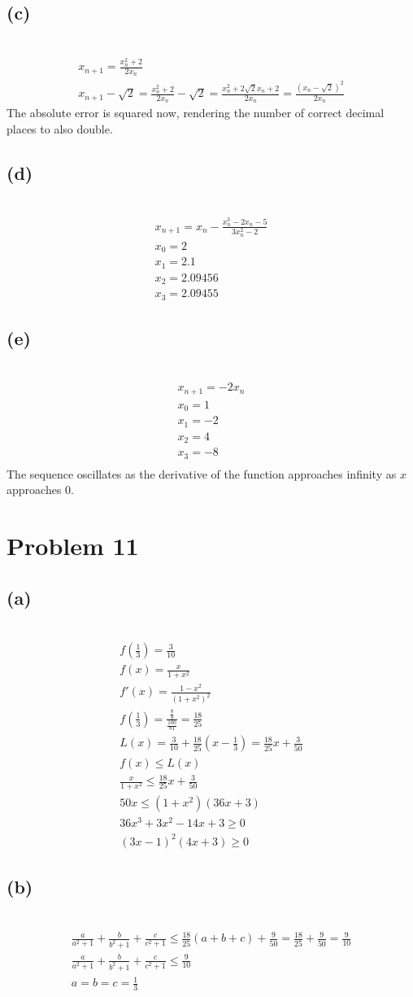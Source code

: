 \documentclass[12pt]{article}
\newcommand{\vem}{\vspace{0.5em}}
\newcommand{\problem}[1]{\section{Problem #1}}
\newcommand{\subproblem}[1]{\subsection{(#1)} \,}
\begin{document}
\subproblem{c}
\begin{gather*}
    x_{n+1}=\frac{x_n^2+2}{2x_n}\\
    x_{n+1}-\sqrt{2}=\frac{x_n^2+2}{2x_n}-\sqrt{2}=\frac{x_n^2+2\sqrt2 x_n+2}{2x_n}= \frac{(x_n-\sqrt{2})^2}{2x_n}
\end{gather*}
The absolute error is squared now, rendering the number of correct decimal places to also double. \vem

\subproblem{d}
\begin{gather*}
    x_{n+1}=x_n-\frac{x_n^3-2x_n-5}{3x_n^2-2}\\
    x_0=2\\
    x_1=2.1\\
    x_2=2.09456\\
    x_3=2.09455
\end{gather*}

\subproblem{e}
\begin{gather*}
    x_{n+1}=-2x_n\\
    x_0=1\\
    x_1=-2\\
    x_2=4\\
    x_3=-8\\
\end{gather*}
The sequence oscillates as the derivative of the function approaches infinity as $x$ approaches 0.

\problem{11}

\subproblem{a}
\begin{gather*}
    f(\frac{1}{3})=\frac{3}{10}\\
    f(x)=\frac{x}{1+x^2}\\
    f'(x)=\frac{1-x^2}{(1+x^2)^2}\\
    f(\frac{1}{3})=\frac{\frac{8}{9}}{\frac{100}{81}} = \frac{18}{25}\\
    L(x)=\frac{3}{10}+\frac{18}{25}(x-\frac{1}{3})= \frac{18}{25}x + \frac{3}{50}\\
    f(x)\le L(x)\\
    \frac{x}{1+x^2}\le \frac{18}{25}x+\frac{3}{50}\\
    50x \le (1+x^2)(36x+3)\\
    36x^3+3x^2-14x+3 \ge 0\\
    (3x-1)^2(4x+3)\ge 0
\end{gather*}

\subproblem{b}
\begin{gather*}
    \frac{a}{a^2+1}+\frac{b}{b^2+1}+\frac{c}{c^2+1} \le \frac{18}{25}(a+b+c)+\frac{9}{50} =\frac{18}{25}+\frac{9}{50}= \frac{9}{10}\\
    \boxed{\frac{a}{a^2+1}+\frac{b}{b^2+1}+\frac{c}{c^2+1} \le \frac{9}{10}}\\
    \boxed{a=b=c=\frac{1}{3}}
\end{gather*}
\end{document}
